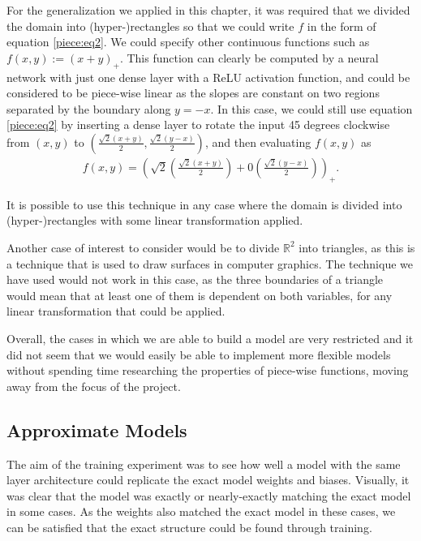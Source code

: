 \documentclass{somasmsc}
\begin{document}
For the generalization we applied in this chapter, it was required that we divided the domain into (hyper-)rectangles so that we could write $f$ in the form of equation \ref{piece:eq2}. We could specify other continuous functions such as $f(x, y) := \left(x + y\right)_+$. This function can clearly be computed by a neural network with just one dense layer with a ReLU activation function, and could be considered to be piece-wise linear as the slopes are constant on two regions separated by the boundary along $y = -x$. In this case, we could still use equation \ref{piece:eq2} by inserting a dense layer to rotate the input 45 degrees clockwise from $\left(x, y\right)$ to $\left(\frac{\sqrt{2}\left(x+y\right)}{2}, \frac{\sqrt{2}\left(y-x\right)}{2}\right)$, and then evaluating $f(x,y)$ as
\begin{align*}
    f(x,y) = \left(\sqrt{2}\left(\frac{\sqrt{2}\left(x+y\right)}{2}\right) + 0 \left(\frac{\sqrt{2}\left(y-x\right)}{2}\right)\right)_+.
\end{align*}

It is possible to use this technique in any case where the domain is divided into (hyper-)rectangles with some linear transformation applied.

Another case of interest to consider would be to divide $\mathbb{R}^2$ into triangles, as this is a technique that is used to draw surfaces in computer graphics. The technique we have used would not work in this case, as the three boundaries of a triangle would mean that at least one of them is dependent on both variables, for any linear transformation that could be applied.

Overall, the cases in which we are able to build a model are very restricted and it did not seem that we would easily be able to implement more flexible models without spending time researching the properties of piece-wise functions, moving away from the focus of the project.

\subsection{Approximate Models}

The aim of the training experiment was to see how well a model with the same layer architecture could replicate the exact model weights and biases. Visually, it was clear that the model was exactly or nearly-exactly matching the exact model in some cases. As the weights also matched the exact model in these cases, we can be satisfied that the exact structure could be found through training.
\end{document}
